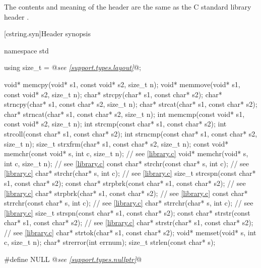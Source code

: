 \pnum
{}%
The contents and meaning of the header 
are the same as the C standard library header .


[cstring.syn]{Header  synopsis}

%
%
%
%
%
%
%
%
%
%
%
%
%
%
%
%
%
%
%
%
%
%
%
%
\begin{codeblock}
namespace std {
  using size_t = @\textit{see \ref{support.types.layout}}@;

  void* memcpy(void* s1, const void* s2, size_t n);
  void* memmove(void* s1, const void* s2, size_t n);
  char* strcpy(char* s1, const char* s2);
  char* strncpy(char* s1, const char* s2, size_t n);
  char* strcat(char* s1, const char* s2);
  char* strncat(char* s1, const char* s2, size_t n);
  int memcmp(const void* s1, const void* s2, size_t n);
  int strcmp(const char* s1, const char* s2);
  int strcoll(const char* s1, const char* s2);
  int strncmp(const char* s1, const char* s2, size_t n);
  size_t strxfrm(char* s1, const char* s2, size_t n);
  const void* memchr(const void* s, int c, size_t n);  // see \ref{library.c}
  void* memchr(void* s, int c, size_t n);  // see \ref{library.c}
  const char* strchr(const char* s, int c);  // see \ref{library.c}
  char* strchr(char* s, int c);  // see \ref{library.c}
  size_t strcspn(const char* s1, const char* s2);
  const char* strpbrk(const char* s1, const char* s2);  // see \ref{library.c}
  char* strpbrk(char* s1, const char* s2);  // see \ref{library.c}
  const char* strrchr(const char* s, int c);  // see \ref{library.c}
  char* strrchr(char* s, int c);  // see \ref{library.c}
  size_t strspn(const char* s1, const char* s2);
  const char* strstr(const char* s1, const char* s2);  // see \ref{library.c}
  char* strstr(char* s1, const char* s2);  // see \ref{library.c}
  char* strtok(char* s1, const char* s2);
  void* memset(void* s, int c, size_t n);
  char* strerror(int errnum);
  size_t strlen(const char* s);
}

#define NULL @\textit{see \ref{support.types.nullptr}}@
\end{codeblock}

